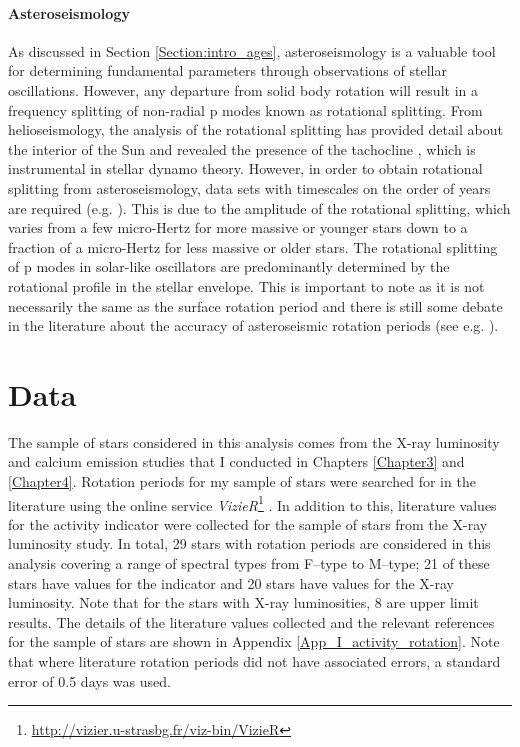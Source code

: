 \paragraph{Asteroseismology}
As discussed in Section \ref{Section:intro_ages}, asteroseismology is a valuable tool for determining fundamental parameters through observations of stellar oscillations. However, any departure from solid body rotation will result in a frequency splitting of non-radial p modes known as rotational splitting. From helioseismology, the analysis of the rotational splitting has provided detail about the interior of the Sun and revealed the presence of the tachocline \citep{Spiegel_Zahn_1992}, which is instrumental in stellar dynamo theory. However, in order to obtain rotational splitting from asteroseismology, data sets with timescales on the order of years are required (e.g. \citealt{Davies_etal_2015}). This is due to the amplitude of the rotational splitting, which varies from a few micro-Hertz for more massive or younger stars down to a fraction of a micro-Hertz for less massive or older stars. The rotational splitting of p modes in solar-like oscillators are predominantly determined by the rotational profile in the stellar envelope. This is important to note as it is not necessarily the same as the surface rotation period and there is still some debate in the literature about the accuracy of asteroseismic rotation periods (see e.g. \citealt{Barnes_etal_2016_aspect_gyro}).

\section{Data}
\label{Chp5_data}

The sample of stars considered in this analysis comes from the X-ray luminosity and calcium emission studies that I conducted in Chapters \ref{Chapter3} and \ref{Chapter4}. Rotation periods for my sample of stars were searched for in the literature using the online service \textit{VizieR}\footnote{\href{http://vizier.u-strasbg.fr/viz-bin/VizieR}{http://vizier.u-strasbg.fr/viz-bin/VizieR}} \citep{Ochsenbein_etal_2000}. In addition to this, literature values for the \Rprime activity indicator were collected for the sample of stars from the X-ray luminosity study. In total, 29 stars with rotation periods are considered in this analysis covering a range of spectral types from F--type to M--type; 21 of these stars have values for the \Rprime indicator and 20 stars have values for the X-ray luminosity. Note that for the stars with X-ray luminosities, 8 are upper limit results. The details of the literature values collected and the relevant references for the sample of stars are shown in Appendix \ref{App_I_activity_rotation}. Note that where literature rotation periods did not have associated errors, a standard error of 0.5 days was used.

